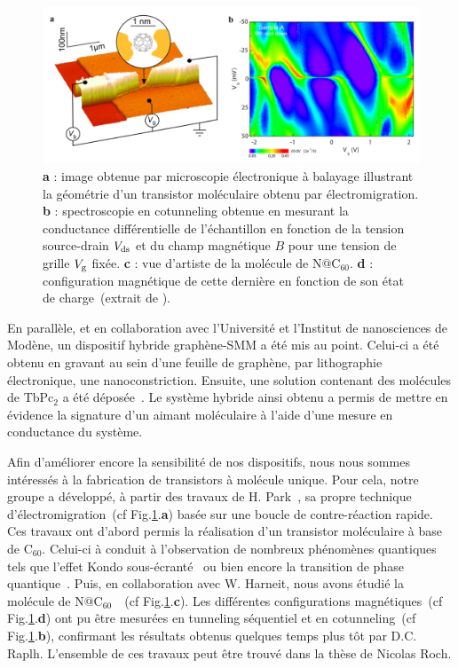 \begin{figure}
\centering \includegraphics[scale=0.45]{Spintronique/RochC60/RochC60.pdf}
\caption{\textbf{a} : image obtenue par microscopie électronique à balayage illustrant la géométrie d'un transistor moléculaire obtenu par électromigration. \textbf{b} : spectroscopie en cotunneling obtenue en mesurant la conductance différentielle de l'échantillon en fonction de la tension source-drain $V_{\rm{ds}}$ et du champ magnétique $B$ pour une tension de grille $V_{\rm{g}}$ fixée. \textbf{c} : vue d'artiste de la molécule de N@C$_{60}$. \textbf{d} : configuration magnétique de cette dernière en fonction de son état de charge~(extrait de \cite{Roch2011}).}
\label{RochC60}
\end{figure}

En parallèle, et en collaboration avec l'Université et l'Institut de nanosciences de Modène, un dispositif hybride graphène-SMM a été mis au point. Celui-ci a été obtenu en gravant au sein d'une feuille de graphène, par lithographie électronique, une nanoconstriction. Ensuite, une solution contenant des molécules de TbPc$_{2}$ a été déposée~\cite{Candini2011}. Le système hybride ainsi obtenu a permis de mettre en évidence la signature d'un aimant moléculaire à l'aide d'une mesure en conductance du système.

Afin d'améliorer encore la sensibilité de nos dispositifs, nous nous sommes intéressés à la fabrication de transistors à molécule unique. Pour cela, notre groupe a développé, à partir des travaux de H. Park~\cite{Park1999}, sa propre technique d'électromigration~(cf Fig.\ref{RochC60}.\textbf{a}) basée sur une boucle de contre-réaction rapide. Ces travaux ont d'abord permis la réalisation d'un transistor moléculaire à base de C$_{60}$. Celui-ci à conduit à l'observation de nombreux phénomènes quantiques tels que l'effet Kondo sous-écranté~\cite{Roch2009} ou bien encore la transition de phase quantique~\cite{Roch2008}. Puis, en collaboration avec W. Harneit, nous avons étudié la molécule de N@C$_{60}$~\cite{Roch2011}~(cf Fig.\ref{RochC60}.\textbf{c}). Les différentes configurations magnétiques~(cf Fig.\ref{RochC60}.\textbf{d}) ont pu \^etre mesurées en tunneling séquentiel et en cotunneling~(cf Fig.\ref{RochC60}.\textbf{b}), confirmant les résultats obtenus quelques temps plus tôt par D.C. Raplh. L'ensemble de ces travaux peut être trouvé dans la thèse de Nicolas Roch.

